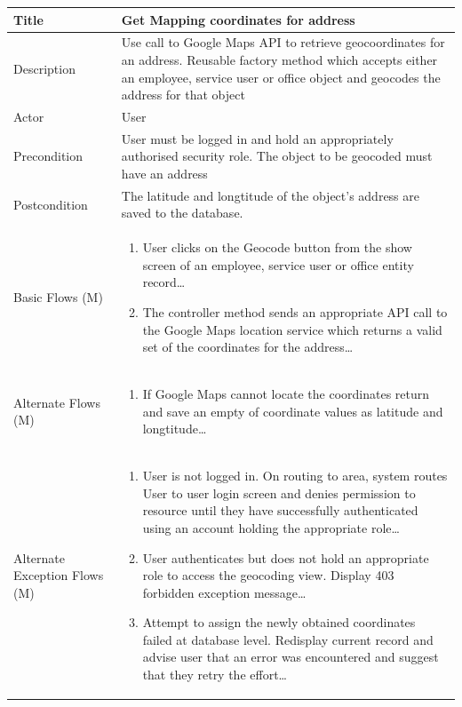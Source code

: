 \documentclass[a4paper,12pt]{article}
\newcommand\addrow[2]{#1 &#2\\ }
\newcommand\addheading[2]{#1 &#2\\ \hline}
\newcommand\tabularhead{\begin{tabular}{lp{8cm}}
\hline
}
\newcommand\addmulrow[2]{ \begin{minipage}[t][][t]{2.5cm}#1\end{minipage}%
   &\begin{minipage}[t][][t]{8cm}
    \begin{enumerate} #2   \end{enumerate}
    \end{minipage}\\ }
\newenvironment{usecase}{\tabularhead}
{\hline\end{tabular}}
\begin{document}
\begin{samepage}
\begin{usecase}
    \addheading{Title}{Get Mapping coordinates for address}
  \addheading{Description}{Use call to Google Maps API to retrieve geocoordinates for an address. Reusable factory method which accepts either an employee, service user or office object and geocodes the address for that object}
  \addheading{Actor}{User} 
  \addrow{Precondition}{User must be logged in and hold an appropriately authorised security role. The object to be geocoded must have an address}
  \addrow{Postcondition}{The latitude and longtitude of the object's address are saved to the database.}
  \addmulrow{Basic Flows (M)}{\item User clicks on the Geocode button from the show screen of an employee, service user or office entity record\ldots
  \newpage
  \item The controller method sends an appropriate API call to the Google Maps location service which returns a valid set of the coordinates for the address\ldots}
  \addmulrow{Alternate  Flows (M)}{\item If Google Maps cannot locate the coordinates return and save an empty of coordinate values as latitude and longtitude\ldots}
  \addmulrow{Alternate Exception Flows (M)}{\item User is not logged in. On routing to area, system routes User to user login screen and denies permission to resource until they have successfully authenticated using an account holding the appropriate role\ldots
                                                                      \item User authenticates but does not hold an appropriate role to access the geocoding  view. Display 403 forbidden exception message\ldots
                                                                      \item Attempt to assign the newly obtained coordinates failed at database level. Redisplay current record and advise user that an error was encountered and suggest that they retry the effort\ldots}
\end{usecase}


\end{samepage}
\end{document}

